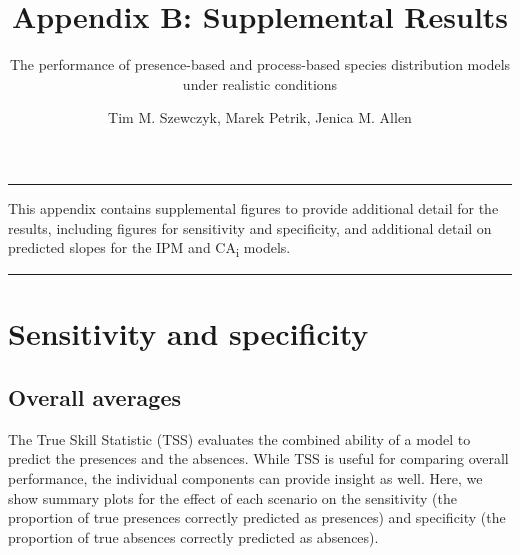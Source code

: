 \documentclass[]{article}
\title{Appendix B: Supplemental Results}
\subtitle{The performance of presence-based and process-based species distribution
models under realistic conditions}
\author{Tim M. Szewczyk, Marek Petrik, Jenica M. Allen}
\date{}
\begin{document}
\maketitle

{
\setcounter{tocdepth}{1}
\tableofcontents
}
\setcounter{table}{0}  \renewcommand{\thetable}{B.\arabic{table}} \setcounter{figure}{0} \renewcommand{\thefigure}{B.\arabic{figure}}

\begin{center}\rule{0.5\linewidth}{\linethickness}\end{center}

This appendix contains supplemental figures to provide additional detail
for the results, including figures for sensitivity and specificity, and
additional detail on predicted slopes for the IPM and
CA\textsubscript{i} models.

\begin{center}\rule{0.5\linewidth}{\linethickness}\end{center}

\newpage
\section{Sensitivity and specificity}

\subsection{Overall averages}

The True Skill Statistic (TSS) evaluates the combined ability of a model
to predict the presences and the absences. While TSS is useful for
comparing overall performance, the individual components can provide
insight as well. Here, we show summary plots for the effect of each
scenario on the sensitivity (the proportion of true presences correctly
predicted as presences) and specificity (the proportion of true absences
correctly predicted as absences).
\end{document}

